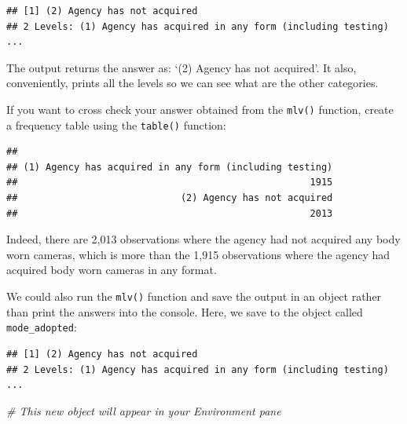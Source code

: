 \documentclass[
]{book}
\newenvironment{Shaded}{\begin{snugshade}}{\end{snugshade}}
\newcommand{\CommentTok}[1]{\textcolor[rgb]{0.56,0.35,0.01}{\textit{#1}}}
\newcommand{\FunctionTok}[1]{\textcolor[rgb]{0.00,0.00,0.00}{#1}}
\newcommand{\NormalTok}[1]{#1}
\newcommand{\OtherTok}[1]{\textcolor[rgb]{0.56,0.35,0.01}{#1}}
\newcommand{\SpecialCharTok}[1]{\textcolor[rgb]{0.00,0.00,0.00}{#1}}
\begin{document}
\begin{verbatim}
## [1] (2) Agency has not acquired
## 2 Levels: (1) Agency has acquired in any form (including testing) ...
\end{verbatim}

The output returns the answer as: `(2) Agency has not acquired'. It also, conveniently, prints all the levels so we can see what are the other categories.

If you want to cross check your answer obtained from the \texttt{mlv()} function, create a frequency table using the \texttt{table()} function:

\begin{Shaded}
\end{Shaded}

\begin{verbatim}
## 
## (1) Agency has acquired in any form (including testing) 
##                                                    1915 
##                             (2) Agency has not acquired 
##                                                    2013
\end{verbatim}

Indeed, there are 2,013 observations where the agency had not acquired any body worn cameras, which is more than the 1,915 observations where the agency had acquired body worn cameras in any format.

We could also run the \texttt{mlv()} function and save the output in an object rather than print the answers into the console. Here, we save to the object called \texttt{mode\_adopted}:

\begin{Shaded}
\end{Shaded}

\begin{verbatim}
## [1] (2) Agency has not acquired
## 2 Levels: (1) Agency has acquired in any form (including testing) ...
\end{verbatim}

\begin{Shaded}
\begin{Highlighting}[]
\CommentTok{\# This new object will appear in your Environment pane}
\end{Highlighting}
\end{Shaded}
\end{document}
